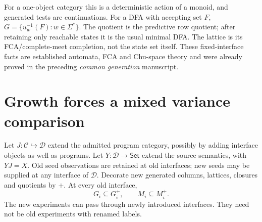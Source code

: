 \documentclass[11pt]{article}
\theoremstyle{definition}\newtheorem{definition}[theorem]{Definition}
\theoremstyle{remark}\newtheorem{remark}[theorem]{Remark}
\begin{document}
For a one-object category this is a deterministic action of a monoid,
and generated tests are continuations. For a DFA with accepting set $F$,
$G=\{u_w^{-1}(F):w\in\Sigma^*\}$. The quotient is the predictive
row quotient; after retaining only reachable states it is the usual
minimal DFA. The lattice is its FCA/complete-meet completion, not the
state set itself. These fixed-interface facts are established automata,
FCA and Chu-space theory and were already proved in the preceding
\emph{common generation} manuscript.

\section{Growth forces a mixed variance comparison}\label{sec:growth}
Let $J:\mathcal C\hookrightarrow\mathcal D$ extend the admitted
program category, possibly by adding interface objects as well as
programs. Let $Y:\mathcal D\to\mathsf{Set}$ extend the source semantics,
with $YJ=X$. Old seed observations are retained at old interfaces;
new seeds may be supplied at any interface of $\mathcal D$. Decorate
new generated columns, lattices, closures and quotients by $+$.
At every old interface,
\[
 G_i\subseteq G_i^+,\qquad M_i\subseteq M_i^+.
\]
The new experiments can pass through newly introduced interfaces.
They need not be old experiments with renamed labels.
\end{document}
